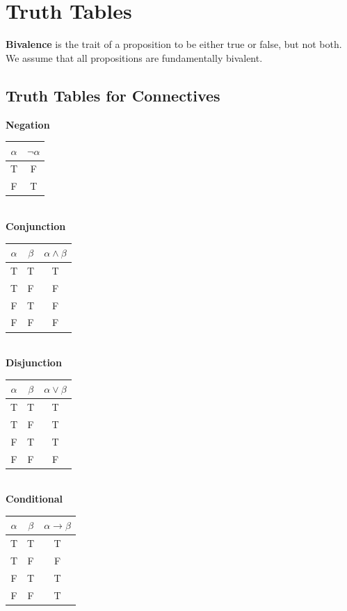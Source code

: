 \documentclass[]{article}
\begin{document}
\section{Truth Tables}
\textbf{Bivalence} is the trait of a proposition to be either true or false, but not both. We assume that all propositions are fundamentally bivalent.
\subsection{Truth Tables for Connectives}
\textbf{Negation}\\
\begin{tabular}{|c|c|}
	\hline
	$\alpha$ & $\neg{\alpha}$\\
	\hline
	T & F \\
	F & T \\
	\hline
\end{tabular}\vspace{10pt}\\
\textbf{Conjunction}\\
\begin{tabular}{|c|c|c|}
	\hline
	$\alpha$ & $\beta$ & $\alpha \wedge \beta$\\
	\hline
	T & T & T\\
	T & F & F\\
	F & T & F\\
	F & F & F\\
	\hline
\end{tabular}\vspace{10pt}\\
\textbf{Disjunction}\\
\begin{tabular}{|c|c|c|}
	\hline
	$\alpha$ & $\beta$ & $\alpha \vee \beta$\\
	\hline
	T & T & T\\
	T & F & T\\
	F & T & T\\
	F & F & F\\
	\hline
\end{tabular}\vspace{10pt}\\
\textbf{Conditional}\\
\begin{tabular}{|c|c|c|}
	\hline
	$\alpha$ & $\beta$ & $\alpha \rightarrow \beta$\\
	\hline
	T & T & T\\
	T & F & F\\
	F & T & T\\
	F & F & T\\
	\hline
\end{tabular}\vspace{10pt}\\
\end{document}
